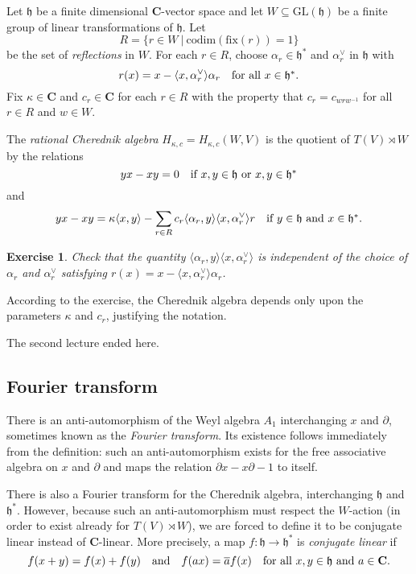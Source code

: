 \documentclass[12pt, reqno]{amsart}
\numberwithin{equation}{section}
\theoremstyle{definition}
\theoremstyle{plain}
\newtheorem{exercise}{Exercise}
\newcommand{\CC}{\mathbf{C}}
\newcommand{\hh}{\mathfrak{h}}
\newcommand{\la}{\langle}
\newcommand{\ra}{\rangle}
\begin{document}
Let $\hh$ be a finite dimensional $\CC$-vector space and let $W \subseteq \mathrm{GL}(\hh)$ be a finite group of linear transformations of $\hh$. Let
$$R=\{r \in W \ | \ \mathrm{codim}(\mathrm{fix}(r))=1 \}$$ be the set of \emph{reflections} in $W$. For each $r \in R$, choose $\alpha_r \in \hh^*$ and $\alpha_r^\vee$ in $\hh$ with
$$r(x)=x-\la x, \alpha_r^\vee \ra \alpha_r \quad \hbox{for all $x \in \hh^*$}.$$ Fix $\kappa \in \CC$ and $c_r \in \CC$ for each $r \in R$ with the property that
$c_r=c_{w r w^{-1}}$ for all $r \in R$ and $w \in W$. 

The \emph{rational Cherednik algebra} $H_{\kappa,c}=H_{\kappa,c}(W,V)$ is the quotient of $T(V) \rtimes W$ by the relations
$$yx-xy=0 \quad \hbox{if $x,y \in \hh$ or $x,y \in \hh^*$}$$ and
$$yx-xy=\kappa \la x,y \ra - \sum_{r \in R} c_r \la \alpha_r,y \ra \la x,\alpha_r^\vee \ra r \quad \hbox{if $y \in \hh$ and $x \in \hh^*$.}$$

\begin{exercise}
Check that the quantity $\la \alpha_r,y \ra \la x, \alpha_r^\vee \ra$ is independent of the choice of $\alpha_r$ and $\alpha_r^\vee$ satisfying $r(x)=x-\la x,\alpha_r ^\vee \ra \alpha_r$.	
\end{exercise} According to the exercise, the Cherednik algebra depends only upon the parameters $\kappa$ and $c_r$, justifying the notation.


The second lecture ended here.

\subsection{Fourier transform} There is an anti-automorphism of the Weyl algebra $A_1$ interchanging $x$ and $\partial$, sometimes known as the \emph{Fourier transform}. Its existence follows immediately from the definition: such an anti-automorphism exists for the free associative algebra on $x$ and $\partial$ and maps the relation $\partial x -x \partial- 1$ to itself.

There is also a Fourier transform for the Cherednik algebra, interchanging $\hh$ and $\hh^*$. However, because such an anti-automorphism must respect the $W$-action (in order to exist already for $T(V) \rtimes W$), we are forced to define it to be conjugate linear instead of $\CC$-linear. More precisely, a map $f:\hh \rightarrow \hh^*$ is \emph{conjugate linear} if 
$$f(x+y)=f(x)+f(y) \quad \text{and} \quad f(a x)=\overline{a} f(x) \quad \hbox{for all $x,y \in \hh$ and $a \in \CC$.}$$ 
\end{document}
